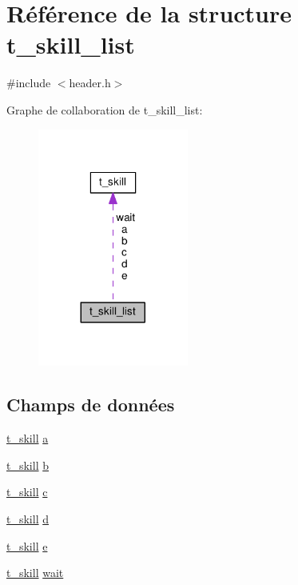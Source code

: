 \hypertarget{structt__skill__list}{\section{Référence de la structure t\+\_\+skill\+\_\+list}
\label{structt__skill__list}
}


{\ttfamily \#include $<$header.\+h$>$}



Graphe de collaboration de t\+\_\+skill\+\_\+list\+:
\nopagebreak
\begin{figure}[H]
\begin{center}
\leavevmode
\includegraphics[width=140pt]{structt__skill__list__coll__graph}
\end{center}
\end{figure}
\subsection*{Champs de données}
\begin{DoxyCompactItemize}
\item 
\hyperlink{structt__skill}{t\+\_\+skill} \hyperlink{structt__skill__list_a39a494bb9ce01ba13ea4577fe2b1cc79}{a}
\item 
\hyperlink{structt__skill}{t\+\_\+skill} \hyperlink{structt__skill__list_a85ae40dbaecefd131b936ec65e9f4809}{b}
\item 
\hyperlink{structt__skill}{t\+\_\+skill} \hyperlink{structt__skill__list_ac9055dd2d5c45c223e3b0e1920c31493}{c}
\item 
\hyperlink{structt__skill}{t\+\_\+skill} \hyperlink{structt__skill__list_a0bb2c4a26ff65aecd7a36ad7ee898cd8}{d}
\item 
\hyperlink{structt__skill}{t\+\_\+skill} \hyperlink{structt__skill__list_aa756d3dbc91762775cff0f4b52526a70}{e}
\item 
\hyperlink{structt__skill}{t\+\_\+skill} \hyperlink{structt__skill__list_a2a4af1a4acb8da6061990f9bd8d0a564}{wait}
\end{DoxyCompactItemize}


